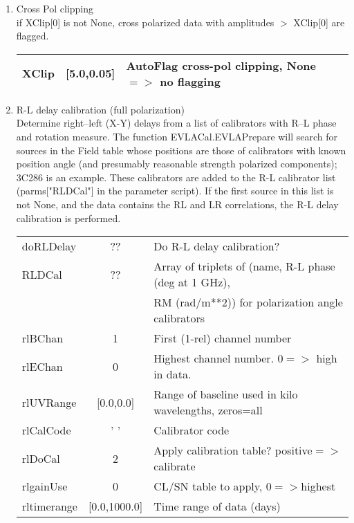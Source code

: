 \documentclass[11pt]{article}
\begin{document}
\begin{enumerate}
\begin{center}
\begin{tabular}{|l|c|l|}
\end{tabular}
\end{center}
%
\item Cross Pol clipping\\
if XClip[0] is not None,  cross polarized data with amplitudes $>$ XClip[0] are flagged.
\begin{center}
\begin{tabular}{|l|c|l|}
\hline
XClip  & [5.0,0.05] & AutoFlag cross-pol clipping, None$=>$ no flagging \\
\hline
\end{tabular}
\end{center}
%
\newpage
\item R-L  delay calibration (full polarization)\\
Determine right--left (X-Y) delays from a list of calibrators with R--L
phase and rotation measure.
The function EVLACal.EVLAPrepare will search for sources in the Field
table whose positions are those of calibrators with known position
angle (and presumably reasonable strength polarized components);
3C286 is an example.
These calibrators are added to the R-L calibrator list (parms["RLDCal"]
in the parameter script).
If the first source in this list is not None, and the data contains
the RL and LR correlations, the R-L delay calibration is performed. \\
\begin{center}
\begin{tabular}{|l|c|l|}
\hline
doRLDelay   & ?? &  Do R-L delay calibration?\\
RLDCal      & ?? &  Array of triplets of (name, R-L phase (deg at 1 GHz), \\
            &    &  RM (rad/m**2)) for polarization angle calibrators\\
rlBChan     & 1            & First (1-rel) channel number\\
rlEChan     & 0            & Highest channel number. $0=>$ high in data. \\
rlUVRange   &  [0.0,0.0]   & Range of baseline used in kilo wavelengths, zeros=all\\
rlCalCode   & '  '         & Calibrator code\\
rlDoCal     & 2            & Apply calibration table? positive$=>$calibrate\\
rlgainUse   & 0            & CL/SN table to apply, $0=>$highest\\
rltimerange & [0.0,1000.0] & Time range of data (days)\\

\end{tabular}
\end{center}
\end{enumerate}
\end{document}
